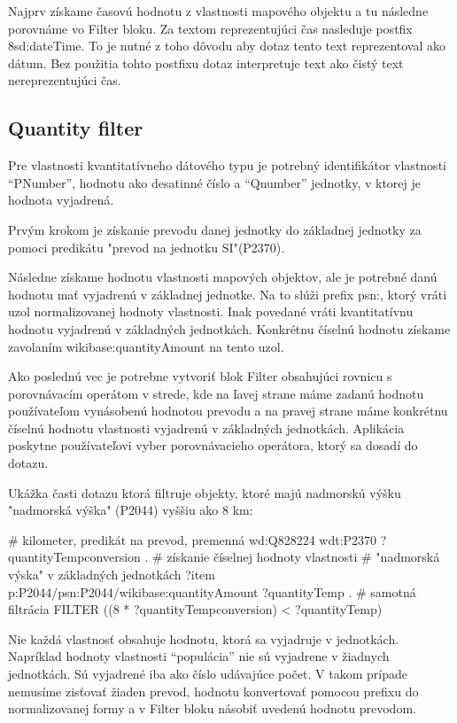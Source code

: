 Najprv získame časovú hodnotu z vlastnosti mapového objektu a tu následne porovnáme vo Filter bloku. 
Za textom reprezentujúci čas nasleduje postfix ^^xsd:dateTime. To je nutné z toho dôvodu aby dotaz tento text 
reprezentoval ako dátum. Bez použitia tohto postfixu dotaz interpretuje text ako čistý text nereprezentujúci čas. 

\subsection*{Quantity filter}
Pre vlastnosti kvantitatívneho dátového typu je potrebný identifikátor vlastnosti “PNumber”, hodnotu ako desatinné číslo a 
“Qnumber” jednotky, v ktorej je hodnota vyjadrená. 

Prvým krokom je získanie prevodu danej jednotky do základnej jednotky za pomoci predikátu 
"prevod na jednotku SI"(P2370). 

Následne získame hodnotu vlastnosti mapových objektov, ale je potrebné danú hodnotu mať vyjadrenú v základnej jednotke. 
Na to slúži prefix psn:, ktorý vráti uzol normalizovanej hodnoty vlastnosti. Inak povedané vráti kvantitatívnu hodnotu vyjadrenú v základných jednotkách. Konkrétnu číselnú hodnotu 
získame zavolaním wikibase:quantityAmount na tento uzol. 

Ako poslednú vec je potrebne vytvoriť blok Filter obsahujúci rovnicu s porovnávacím operátom v strede, kde na ľavej strane máme 
zadanú hodnotu používateľom vynásobenú hodnotou prevodu a na pravej strane máme konkrétnu číselnú hodnotu vlastnosti vyjadrenú v základných jednotkách. 
Aplikácia poskytne používateľovi vyber porovnávacieho operátora, ktorý sa dosadí do dotazu. 

Ukážka časti dotazu ktorá filtruje objekty, 
ktoré majú nadmorskú výšku "nadmorská výška" (P2044) vyššiu ako 8 km: 
\begin{code}
      # kilometer, predikát na prevod, premenná 
      wd:Q828224 wdt:P2370 ?quantityTempconversion .
      # získanie číselnej hodnoty vlastnosti 
      # "nadmorská výska" v základných jednotkách 
      ?item p:P2044/psn:P2044/wikibase:quantityAmount  ?quantityTemp .
      # samotná filtrácia 
      FILTER ((8 * ?quantityTempconversion) < ?quantityTemp)
\end{code}

Nie každá vlastnosť obsahuje hodnotu, ktorá sa vyjadruje v jednotkách. Napríklad hodnoty vlastnosti “populácia” nie sú vyjadrene v žiadnych jednotkách.
Sú vyjadrené iba ako číslo udávajúce počet. 
V takom prípade nemusíme zisťovať žiaden prevod, hodnotu konvertovať pomocou prefixu do normalizovanej formy a v Filter bloku násobiť uvedenú hodnotu prevodom. 







